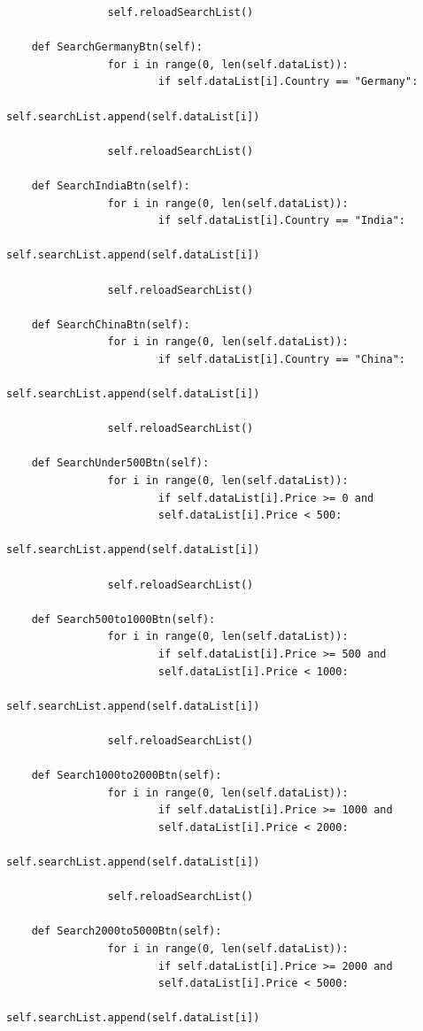\documentclass[12pt]{article}
\begin{document}
\begin{verbatim}
                self.reloadSearchList()

    def SearchGermanyBtn(self):
                for i in range(0, len(self.dataList)):
                        if self.dataList[i].Country == "Germany":
                                self.searchList.append(self.dataList[i])
                
                self.reloadSearchList()

    def SearchIndiaBtn(self):
                for i in range(0, len(self.dataList)):
                        if self.dataList[i].Country == "India":
                                self.searchList.append(self.dataList[i])
                
                self.reloadSearchList()

    def SearchChinaBtn(self):
                for i in range(0, len(self.dataList)):
                        if self.dataList[i].Country == "China":
                                self.searchList.append(self.dataList[i])
                
                self.reloadSearchList()

    def SearchUnder500Btn(self):
                for i in range(0, len(self.dataList)):
                        if self.dataList[i].Price >= 0 and
                        self.dataList[i].Price < 500:
                                self.searchList.append(self.dataList[i])
                
                self.reloadSearchList()

    def Search500to1000Btn(self):
                for i in range(0, len(self.dataList)):
                        if self.dataList[i].Price >= 500 and
                        self.dataList[i].Price < 1000:
                                self.searchList.append(self.dataList[i])
                
                self.reloadSearchList()

    def Search1000to2000Btn(self):
                for i in range(0, len(self.dataList)):
                        if self.dataList[i].Price >= 1000 and
                        self.dataList[i].Price < 2000:
                                self.searchList.append(self.dataList[i])
                
                self.reloadSearchList()

    def Search2000to5000Btn(self):
                for i in range(0, len(self.dataList)):
                        if self.dataList[i].Price >= 2000 and
                        self.dataList[i].Price < 5000:
                                self.searchList.append(self.dataList[i])
                

\end{verbatim}
\end{document}
